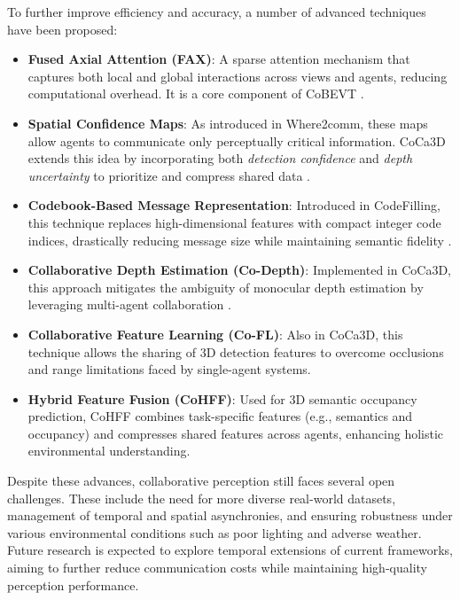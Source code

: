 To further improve efficiency and accuracy, a number of advanced techniques have been proposed:

\begin{itemize}
    \item \textbf{Fused Axial Attention (FAX)}: A sparse attention mechanism that captures both local and global interactions across views and agents, reducing computational overhead. It is a core component of CoBEVT \cite{xu2022cobevtcooperativebirdseye}.
    
    \item \textbf{Spatial Confidence Maps}: As introduced in Where2comm, these maps allow agents to communicate only perceptually critical information. CoCa3D extends this idea by incorporating both \textit{detection confidence} and \textit{depth uncertainty} to prioritize and compress shared data \cite{hu2022where2commcommunicationefficientcollaborativeperception, hu2023collaborationhelpscameraovertake}.
    
    \item \textbf{Codebook-Based Message Representation}: Introduced in CodeFilling, this technique replaces high-dimensional features with compact integer code indices, drastically reducing message size while maintaining semantic fidelity \cite{hu2024communicationefficientcollaborativeperceptioninformation}.
    
    \item \textbf{Collaborative Depth Estimation (Co-Depth)}: Implemented in CoCa3D, this approach mitigates the ambiguity of monocular depth estimation by leveraging multi-agent collaboration \cite{hu2023collaborationhelpscameraovertake}.
    
    \item \textbf{Collaborative Feature Learning (Co-FL)}: Also in CoCa3D, this technique allows the sharing of 3D detection features to overcome occlusions and range limitations faced by single-agent systems.
    
    \item \textbf{Hybrid Feature Fusion (CoHFF)}: Used for 3D semantic occupancy prediction, CoHFF combines task-specific features (e.g., semantics and occupancy) and compresses shared features across agents, enhancing holistic environmental understanding.
\end{itemize}

Despite these advances, collaborative perception still faces several open challenges. These include the need for more diverse real-world datasets, management of temporal and spatial asynchronies, and ensuring robustness under various environmental conditions such as poor lighting and adverse weather. Future research is expected to explore temporal extensions of current frameworks, aiming to further reduce communication costs while maintaining high-quality perception performance.



